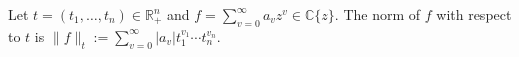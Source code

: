 Let $t = (t_1, \ldots, t_n) \in \mathbb{R}_+^n$ and $f = \sum_{v=0}^{\infty} a_v z^v \in \mathbb{C}\{z\}$. The norm of $f$ with respect to $t$ is $\|f\|_t := \sum_{v=0}^{\infty} |a_v| t_1^{v_1} \cdots t_n^{v_n}$.
